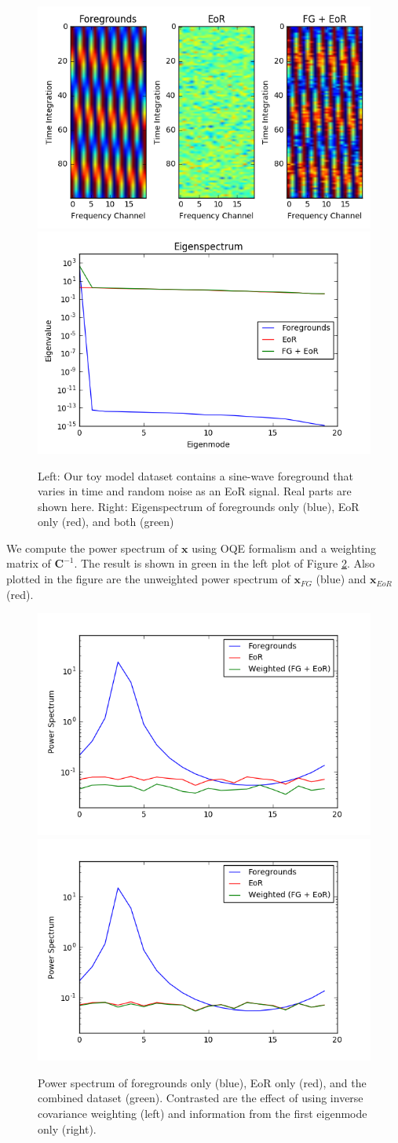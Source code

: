 \documentclass[preprint2,numberedappendix,tighten,twocolappendix]{aastex6}  %
\begin{document}
\begin{figure}
	\centering
	\includegraphics[trim={0.3cm 0.2cm 0cm 0.3cm},clip,height=0.3\textwidth]{plots/toy_sigloss1.png}
	\includegraphics[trim={0.3cm 0.2cm 0cm 0.3cm},clip,height=0.3\textwidth]{plots/toy_sigloss2.png}
	\caption{Left: Our toy model dataset contains a sine-wave foreground that varies in time and random noise as an EoR signal. Real parts are shown here. Right: Eigenspectrum of foregrounds only (blue), EoR only (red), and both (green)}
	\label{fig:toy_sigloss1}
\end{figure}

We compute the power spectrum of $\textbf{x}$ using OQE formalism and a weighting matrix of $\textbf{C}^{-1}$. The result is shown in green in the left plot of Figure \ref{fig:toy_sigloss3}. Also plotted in the figure are the unweighted power spectrum of $\textbf{x}_{FG}$ (blue) and $\textbf{x}_{EoR}$ (red). 

\begin{figure}
	\centering
	\includegraphics[trim={0.3cm 0.2cm 1cm 0.3cm},clip,height=0.3\textwidth]{plots/toy_sigloss3.png}
	\includegraphics[trim={1cm 0.2cm 0cm 0.3cm},clip,height=0.3\textwidth]{plots/toy_sigloss4.png}
	\caption{Power spectrum of foregrounds only (blue), EoR only (red), and the combined dataset (green). Contrasted are the effect of using inverse covariance weighting (left) and information from the first eigenmode only (right).}
	\label{fig:toy_sigloss3}
\end{figure}
\end{document}
